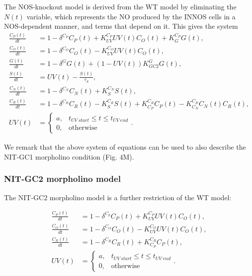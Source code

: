 \documentclass[
  10pt,
  onecolumn]{article}
\begin{document}
The NOS-knockout model is derived from the WT model by eliminating the
\(N(t)\) variable, which represents the NO produced by the INNOS cells
in a NOS-dependent manner, and terms that depend on it. This gives the
system \begin{align*}
\frac{C_P(t)}{dt} &= 1 - \delta^{C_P} C_P(t) + K_{UV}^{C_P} UV(t) C_O(t) + K_{G}^{C_P} G(t) , \\
\frac{C_O(t)}{dt} &= 1 - \delta^{C_O} C_O(t) - K_{UV}^{C_O} UV(t) C_O(t), \\
\frac{G(t)}{dt} &= 1 - \delta^{G} G(t)+ \left(1 - UV(t)\right)K_{GC2}^G G(t), \\
\frac{S(t)}{dt} &= UV(t) - \frac{S(t)}{\tau_S}, \\
\frac{C_N(t)}{dt} &= 1 - \delta^{C_N} C_N(t) + K_{S}^{C_N} S(t), \\
\frac{C_R(t)}{dt} &= 1 - \delta^{C_R} C_R(t) - K_{S}^{C_R} S(t) + K_{C_P}^{C_R} C_P(t) - K_{C_N}^{C_R} C_N(t) C_R(t), \\
UV(t) &=
    \begin{cases}
        a, & t_{UV\: start} \leq t \leq t_{UV\: end}\\
        0, & \text{otherwise}
    \end{cases}   .
\end{align*}

We remark that the above system of equations can be used to also
describe the NIT-GC1 morpholino condition (Fig. 4M).

\hypertarget{nit-gc2-morpholino-model}{%
\subsubsection{NIT-GC2 morpholino
model}\label{nit-gc2-morpholino-model}}

The NIT-GC2 morpholino model is a further restriction of the WT model:

\begin{align*}
\frac{C_P(t)}{dt} &= 1 - \delta^{C_p} C_P(t) + K_{UV}^{C_P} UV(t) C_O(t) , \\
\frac{C_O(t)}{dt} &= 1 - \delta^{C_O} C_O(t) - K_{UV}^{C_O} UV(t) C_O(t), \\
\frac{C_R(t)}{dt} &= 1 - \delta^{C_R} C_R(t) + K_{C_P}^{C_R} C_P(t), \\
UV(t) &=
    \begin{cases}
        a, & t_{UV\: start} \leq t \leq t_{UV\: end}\\
        0, & \text{otherwise}
    \end{cases} .
\end{align*}
\end{document}

